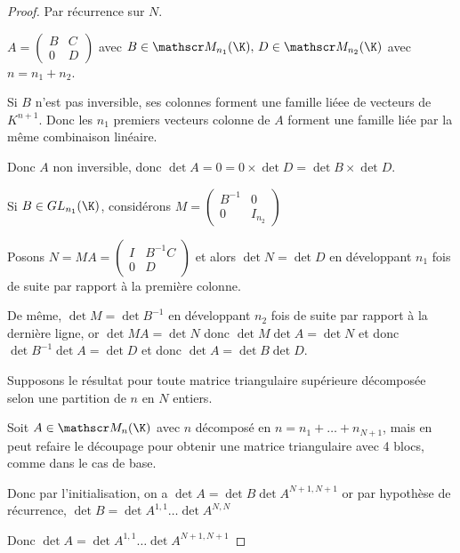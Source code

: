 \begin{proof}
    Par récurrence sur $N$. 


    $A = \begin{pmatrix}
        B & C \\
        0 & D 
    \end{pmatrix}$ avec $B \in \mathscr M_{n_1}(\K), \, D \in \mathscr M_{n_2}(\K)$ avec $ n = n_1 + n_2$. 

    Si $B$ n'est pas inversible, ses colonnes forment une famille liéee de vecteurs de $K^{n + 1}$. Donc les 
    $n_1$ premiers vecteurs colonne de $A$ forment une famille liée par la même combinaison linéaire. 

    Donc $A$ non inversible, donc $\det A = 0 = 0 \times \det D = \det B \times \det D$. 

    \avspace Si $B \in GL_{n_1}(\K)$, considérons $M = \begin{pmatrix}
        B^{-1} & 0 \\
        0 & I_{n_2}
    \end{pmatrix}$

    Posons $N = MA = \begin{pmatrix}
        I & B^{-1}C \\
        0 & D 
    \end{pmatrix}$ et alors $\det N = \det D$ en développant $n_1$ fois de suite par rapport à la première colonne. 

    De même, $\det M = \det B^{-1}$ en développant $n_2$ fois de suite par rapport à la dernière ligne, or 
    $\det MA = \det N$ donc $\det M \det A = \det N$ et donc $\det B^{-1} \det A = \det D$ 
    et donc $\det A = \det B \det D$. 

    Supposons le résultat pour toute matrice triangulaire supérieure décomposée selon une partition de $n$ en $N$ entiers. 

    Soit $A \in \mathscr M_n(\K)$ avec $n$ décomposé en $n = n_1 + \dots + n_{N + 1}$, mais en 
    peut refaire le découpage pour obtenir une matrice triangulaire avec 4 blocs, comme dans le cas de base. 

    Donc par l'initialisation, on a $\det A = \det B \det A^{N + 1, N + 1}$ or par hypothèse de récurrence, 
    $\det B = \det A^{1, 1} \dots \det A^{N, N}$

    Donc $\det A = \det A^{1, 1} \dots \det A^{N + 1, N + 1}$
\end{proof}
